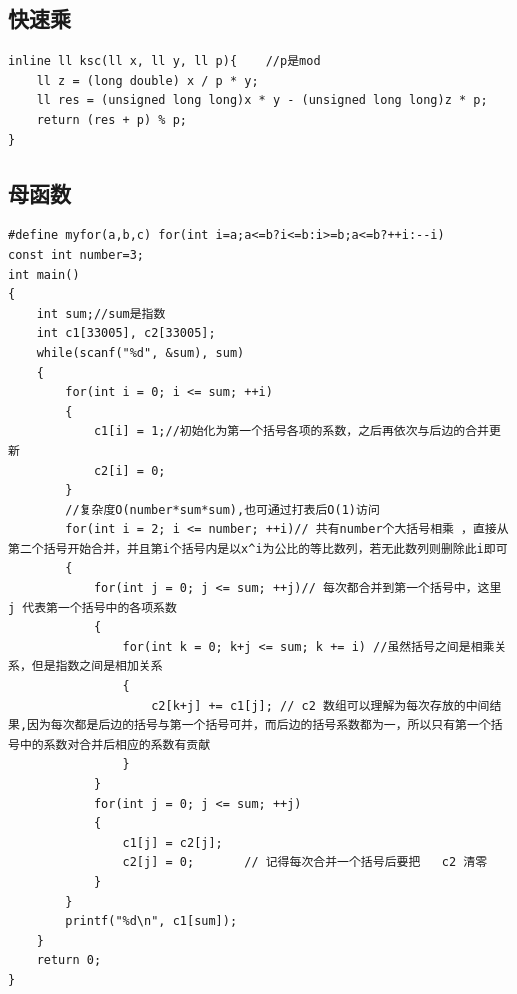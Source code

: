 \documentclass[twoside]{article}
\begin{document}
\subsection{快速乘}
\begin{lstlisting}
inline ll ksc(ll x, ll y, ll p){	//p是mod
	ll z = (long double) x / p * y;
	ll res = (unsigned long long)x * y - (unsigned long long)z * p;
	return (res + p) % p;
}\end{lstlisting}
\subsection{母函数 }
\begin{lstlisting}
#define myfor(a,b,c) for(int i=a;a<=b?i<=b:i>=b;a<=b?++i:--i)
const int number=3;
int main()
{
    int sum;//sum是指数
    int c1[33005], c2[33005];
    while(scanf("%d", &sum), sum)
    {
        for(int i = 0; i <= sum; ++i)
        {
            c1[i] = 1;//初始化为第一个括号各项的系数，之后再依次与后边的合并更新
            c2[i] = 0;
        }
        //复杂度O(number*sum*sum),也可通过打表后O(1)访问
        for(int i = 2; i <= number; ++i)// 共有number个大括号相乘 ，直接从第二个括号开始合并，并且第i个括号内是以x^i为公比的等比数列，若无此数列则删除此i即可
        {
            for(int j = 0; j <= sum; ++j)// 每次都合并到第一个括号中，这里 j 代表第一个括号中的各项系数
            {
                for(int k = 0; k+j <= sum; k += i) //虽然括号之间是相乘关系，但是指数之间是相加关系
                {
                    c2[k+j] += c1[j]; // c2 数组可以理解为每次存放的中间结果,因为每次都是后边的括号与第一个括号可并，而后边的括号系数都为一，所以只有第一个括号中的系数对合并后相应的系数有贡献
                }
            }
            for(int j = 0; j <= sum; ++j)
            {
                c1[j] = c2[j];
                c2[j] = 0;       // 记得每次合并一个括号后要把   c2 清零
            }
        }
        printf("%d\n", c1[sum]);
    }
    return 0;
}\end{lstlisting}
\end{document}
